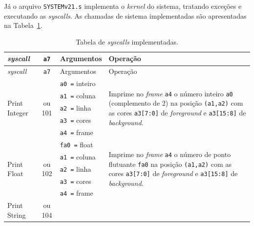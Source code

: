     { Já o arquivo \texttt{SYSTEMv21.s} implementa o \textit{kernel} do sistema,
        tratando exceções e executando as \textit{syscalls}. As chamadas de
        sistema implementadas são apresentadas na Tabela~\ref{table:syscalls}.
    }
    \begin{longtable}{|l|c|p{3.5cm}|l |}
        \caption{Tabela de \textit{syscalls} implementadas.}\label{table:syscalls}\\
        \hline
        \textit{syscall}                    & \texttt{a7}             & Argumentos                & Operação\\*
        \hline
        \endfirsthead
        \hline
        \textit{syscall}                    & \texttt{a7}             & Argumentos                & Operação\\*
        \hline
        \endhead
        \multirow{5}{*}{Print Integer}      & \multirow{5}{*}{\parbox{0.6cm}{ ou 101}}
              & \texttt{a0 =} inteiro     & \multirow{5}{*}{\parbox{7cm}{Imprime no \textit{frame} \texttt{a4} o número inteiro \texttt{a0} (complemento de 2) na
                                                posição \texttt{(a1,a2)} com as cores \texttt{a3[7:0]} de \textit{foreground} e \texttt{a3[15:8]} de \textit{background}.}}\\*
            & & \texttt{a1 =} coluna      & \\*
            & & \texttt{a2 =} linha       & \\*
            & & \texttt{a3 =} cores       & \\*
            & & \texttt{a4 =} frame       & \\
        \hline
        \multirow{5}{*}{Print Float}        & \multirow{5}{*}{\parbox{0.6cm}{ ou 102}}
              & \texttt{fa0 =} float      & \multirow{5}{*}{\parbox{7cm}{Imprime no \textit{frame} \texttt{a4} o número de ponto flutuante \texttt{fa0} na
                                                posição \texttt{(a1,a2)} com as cores \texttt{a3[7:0]} de \textit{foreground} e \texttt{a3[15:8]} de \textit{background}.}}\\*
            & & \texttt{a1 =} coluna      & \\*
            & & \texttt{a2 =} linha       & \\*
            & & \texttt{a3 =} cores       & \\*
            & & \texttt{a4 =} frame       & \\
        \hline
        \multirow{5}{*}{Print String}       & \multirow{5}{*}{\parbox{0.6cm}{ ou 104}}

\end{longtable}
